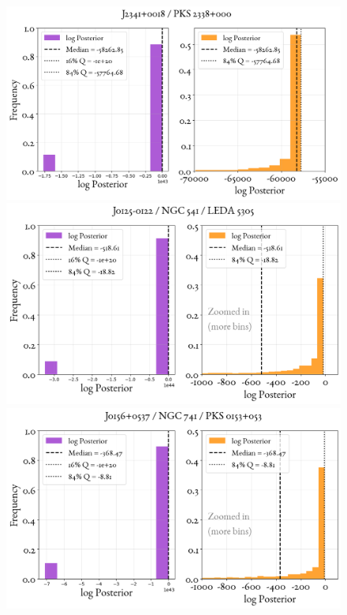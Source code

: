 \begin{figure}
    \centering
    \includegraphics[width=0.8\linewidth]{figures/ResultPosteriors/86_Posterior_5170.png}\\
     \includegraphics[width=0.8\linewidth]{figures/ResultPosteriors/93_Posterior_5260.png}\\
      \includegraphics[width=0.8\linewidth]{figures/ResultPosteriors/94_Posterior_5261.png}  
\end{figure}

